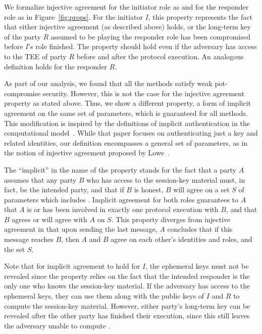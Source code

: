 %
We formalize injective agreement for the initiator role as \mPredInjI{} and
for the responder role as \mPredInjR{} in Figure~\ref{fig:props}.
%
For the initiator $I$, this property represents the fact that either
injective agreement (as described above) holds, or the long-term key of
the party $R$ assumed to be playing the responder role has been
compromised before $I$'s role finished.
%
The property should hold even if the adversary has access to the TEE of party $R$
before and after the protocol execution.
%
An analogous definition holds for the responder $R$.
%

As part of our analysis, we found that all the \mEdhoc{} methods satisfy weak
pot-compromise security.
%
However, this is not the case for the injective agreement property as stated 
above.
%
Thus, we show a different property, a form of implicit agreement on the same
set of parameters, which is guaranteed for all methods.
%
This modification is inspired by the definitions of implicit authentication in
the computational model~\cite{DBLP:conf/csfw/GuilhemFW20}.
%
While that paper focuses on authenticating just a key and related identities,
our definition encompasses a general set of parameters, as in the notion of
injective agreement proposed by Lowe~\cite{DBLP:conf/csfw/Lowe97a}.

The ``implicit'' in the name of the property stands for the fact that a party
$A$ assumes that any party $B$ who has access to the session-key material
\mSessKey{} must, in fact, be the intended party, and that if $B$ is honest,
$B$ will agree on a set $S$ of parameters which includes \mSessKey.
%
Implicit agreement for both roles guarantees to $A$ that $A$ is or has been
involved in exactly one protocol execution with $B$, and that $B$ agrees or
will agree with $A$ on $S$.
%
This property diverges from injective agreement in that upon sending
the last message, $A$ concludes that if this message reaches $B$, then $A$
and $B$ agree on each other's identities and roles, and the set $S$.
%

Note that for implicit agreement to hold for $I$, the ephemeral keys must not
be revealed since the property relies on the fact that the intended responder
is the only one who knows the session-key material.
%
If the adversary has access to the ephemeral keys, they can use them along 
with
the public keys of $I$ and $R$ to compute the session-key material.
%
However, either party's long-term key can be revealed after the other
party has finished their execution, since this still leaves the adversary
unable to compute \mGxy{}.
%

